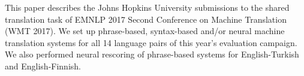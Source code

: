 This paper describes the Johns Hopkins University submissions to the shared translation task of EMNLP 2017 Second Conference on Machine Translation (WMT 2017). We set up phrase-based, syntax-based and/or  neural machine translation systems for all 14 language pairs of this year's evaluation campaign. We also performed neural rescoring of phrase-based systems for English-Turkish and English-Finnish.
